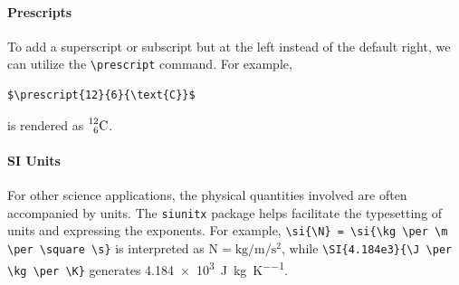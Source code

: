 \paragraph{Prescripts} To add a superscript or subscript but at the left instead of the default right, we can utilize the \texttt{\textbackslash prescript} command. For example,
\begin{lstlisting}
$\prescript{12}{6}{\text{C}}$
\end{lstlisting}
is rendered as $\prescript{12}{6}{\text{C}}$.

\paragraph{SI Units}
For other science applications, the physical quantities involved are often accompanied by units. The \verb|siunitx| package helps facilitate the typesetting of units and expressing the exponents. For example, \texttt{\textbackslash si\{\textbackslash N\} = \textbackslash si\{\textbackslash kg \textbackslash per \textbackslash m \textbackslash per \textbackslash square \textbackslash s\}} is interpreted as $\si{\N} = \si{\kg \per \m \per \square \s}$, while \texttt{\textbackslash SI\{4.184e3\}\allowbreak\{\textbackslash J \textbackslash per \textbackslash kg \textbackslash per \textbackslash K\}} generates \SI{4.184e3}{\J \per \kg \per \K}.

